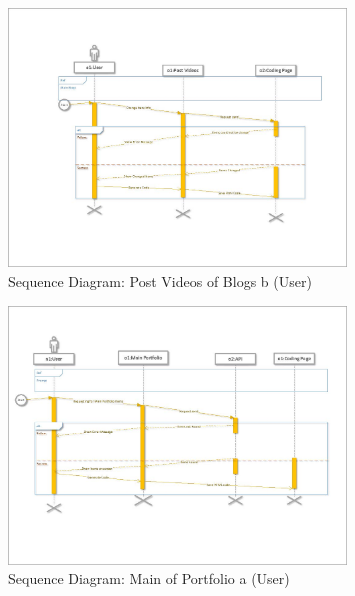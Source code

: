 \documentclass[12pt]{report}
\begin{document}
\begin{figure}[ht]
    \centering
    \includegraphics[width=0.8\textwidth]{Media/s1_Page_19.jpg} %
    \caption{Sequence Diagram: Post Videos of Blogs b (User)}
    \label{fig:drawing1}
\end{figure}



\begin{figure}[ht]
    \centering
    \includegraphics[width=0.8\textwidth]{Media/s1_Page_22.jpg} %
    \caption{Sequence Diagram: Main of Portfolio a (User)}
    \label{fig:drawing1}
\end{figure}
\end{document}
